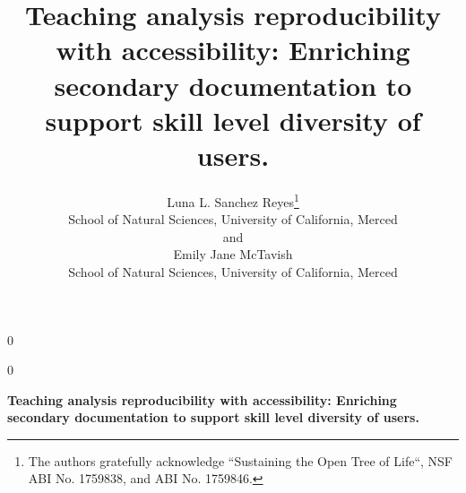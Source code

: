 \documentclass[12pt]{article}
\newcommand{\blind}{0}
\begin{document}
%
%


\def\spacingset#1{\renewcommand{\baselinestretch}%
{#1}\small\normalsize} \spacingset{1}



\blind
{
  \title{\bf Teaching analysis reproducibility with accessibility: Enriching secondary documentation to support skill level diversity of users.}
  \author{Luna L. Sanchez Reyes\thanks{
    The authors gratefully acknowledge ``Sustaining the Open Tree of Life``, NSF ABI No. 1759838, and ABI No. 1759846.}\hspace{.2cm}\\
    School of Natural Sciences, University of California, Merced\\
    and \\
    Emily Jane McTavish \\
    School of Natural Sciences, University of California, Merced}
  \maketitle
} \fi

\blind
{
  \bigskip
  \bigskip
  \bigskip
  \begin{center}
    {\LARGE\bf Teaching analysis reproducibility with accessibility: Enriching secondary documentation to support skill level diversity of users.}
\end{center}
  \medskip
} \fi
\end{document}
